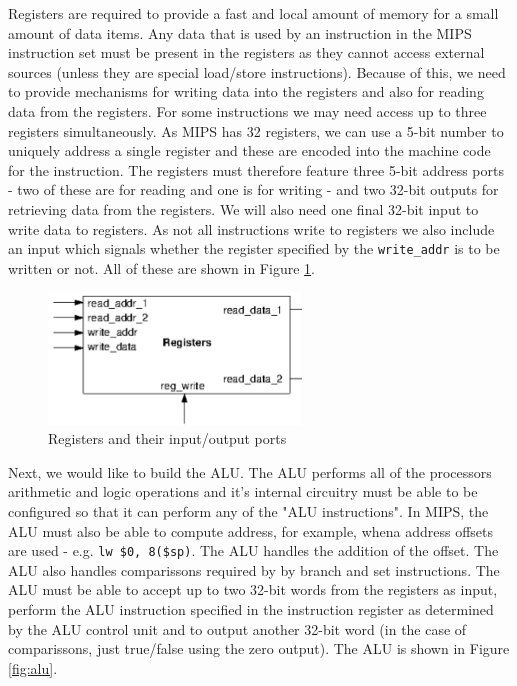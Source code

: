 \documentclass{article}
\begin{document}
	Registers are required to provide a fast and local amount of memory for a small amount of data items. Any data that is used by an instruction in the MIPS instruction set must be present in the registers as they cannot access external sources (unless they are special load/store instructions). Because of this, we need to provide mechanisms for writing data into the registers and also for reading data from the registers. For some instructions we may need access up to three registers simultaneously. As MIPS has 32 registers, we can use a 5-bit number to uniquely address a single register and these are encoded into the machine code for the instruction. The registers must therefore feature three 5-bit address ports - two of these are for reading and one is for writing - and two 32-bit outputs for retrieving data from the registers. We will also need one final 32-bit input to write data to registers. As not all instructions write to registers we also include an input which signals whether the register specified by the \texttt{write\_addr} is to be written or not. All of these are shown in Figure \ref{fig:registers input output}.
	
	\begin{figure}[ht]
		\centering
		\includegraphics[width=0.6\textwidth]{register_architecture}
		\caption{Registers and their input/output ports}
		\label{fig:registers input output}
	\end{figure}
	
	Next, we would like to build the ALU. The ALU performs all of the processors arithmetic and logic operations and it's internal circuitry must be able to be configured so that it can perform any of the "ALU instructions". In MIPS, the ALU must also be able to compute address, for example, whena address offsets are used - e.g. \texttt{lw \$0, 8(\$sp)}. The ALU handles the addition of the offset. The ALU also handles comparissons required by by branch and set instructions. The ALU must be able to accept up to two 32-bit words from the registers as input, perform the ALU instruction specified in the instruction register as determined by the ALU control unit and to output another 32-bit word (in the case of comparissons, just true/false using the zero output). The ALU is shown in Figure \ref{fig:alu}.
	
\end{document}
